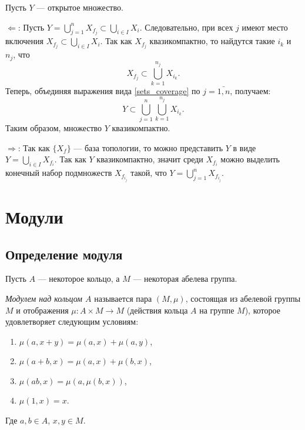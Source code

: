     \begin{Proof}
        Пусть $Y$ --- открытое множество.

        $\Leftarrow$: Пусть $Y = \bigcup_{j = 1}^n X_{f_j} \subset \bigcup_{i \in I} X_i$. Следовательно, при всех $j$ имеют место включения
        $X_{f_j} \subset \bigcup_{i \in I}X_i$. Так как $X_{f_j}$ квазикомпактно, то найдутся такие $i_k$ и $n_j$, что 
        \begin{equation} \label{sets_coverage}
            X_{f_j} \subset \bigcup_{k = 1}^{n_j} X_{i_k}.
        \end{equation}
        Теперь, объединяя выражения вида \eqref{sets_coverage} по $j = \bar{1, n}$, получаем:
        $$
            Y \subset \bigcup_{j = 1}^n \bigcup_{k = 1}^{n_j} X_{i_k}.
        $$
        Таким образом, множество $Y$ квазикомпактно.

        $\Rightarrow$: Так как $\{X_f\}$ --- база топологии, то можно представить $Y$ в виде $Y = \bigcup_{i \in I} X_{f_i}$. Так как $Y$ квазикомпактно, значит среди $X_{f_i}$ можно выделить конечный набор подмножеств 
         $X_{f_{i_j}}$ такой, что $Y = \bigcup_{j = 1}^n X_{f_{i_j}}$.
    \end{Proof}

    \section{Модули}

    \subsection{Определение модуля}

    Пусть $A$ --- некоторое кольцо, а $M$ --- некоторая абелева группа. 
    \begin{Def}
        \textit{Модулем над кольцом $A$} называется пара $(M, \mu)$, состоящая из абелевой группы $M$ и отображения $\mu : A \times M \rightarrow M$ (действия кольца $A$ на группе $M$), 
        которое удовлетворяет следующим условиям:
        \begin{enumerate}
            \item $\mu(a, x + y) = \mu(a, x) + \mu(a, y)$,
            \item $\mu(a + b, x) = \mu(a, x) + \mu(b, x)$,
            \item $\mu(ab, x) = \mu(a, \mu(b, x))$,
            \item $\mu(1, x) = x$.
        \end{enumerate}
        Где $a, b \in A$, $x, y \in M$.
    \end{Def}

